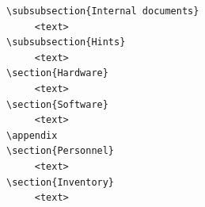 \documentclass[twoside,11pt]{article}
\begin{document}
\begin{verbatim}
\subsubsection{Internal documents}
     <text>
\subsubsection{Hints}
     <text>
\section{Hardware}
     <text>
\section{Software}
     <text>
\appendix
\section{Personnel}
     <text>
\section{Inventory}
     <text>
\end{verbatim}

\newpage
\end{document}

